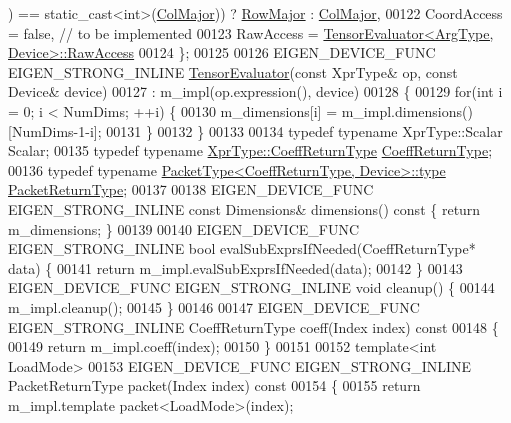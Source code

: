 \begin{DoxyCode}
      ) == static\_cast<int>(\hyperlink{group__enums_ggaacded1a18ae58b0f554751f6cdf9eb13a0cbd4bdd0abcfc0224c5fcb5e4f6669a}{ColMajor})) ? \hyperlink{group__enums_ggaacded1a18ae58b0f554751f6cdf9eb13acfcde9cd8677c5f7caf6bd603666aae3}{RowMajor} : \hyperlink{group__enums_ggaacded1a18ae58b0f554751f6cdf9eb13a0cbd4bdd0abcfc0224c5fcb5e4f6669a}{ColMajor},
00122     CoordAccess = \textcolor{keyword}{false},  \textcolor{comment}{// to be implemented}
00123     RawAccess = \hyperlink{struct_eigen_1_1_tensor_evaluator}{TensorEvaluator<ArgType, Device>::RawAccess}
00124   \};
00125 
00126   EIGEN\_DEVICE\_FUNC EIGEN\_STRONG\_INLINE \hyperlink{struct_eigen_1_1_tensor_evaluator}{TensorEvaluator}(\textcolor{keyword}{const} XprType& op, \textcolor{keyword}{const} Device& 
      device)
00127       : m\_impl(op.expression(), device)
00128   \{
00129     \textcolor{keywordflow}{for}(\textcolor{keywordtype}{int} i = 0; i < NumDims; ++i) \{
00130       m\_dimensions[i] = m\_impl.dimensions()[NumDims-1-i];
00131     \}
00132   \}
00133 
00134   \textcolor{keyword}{typedef} \textcolor{keyword}{typename} XprType::Scalar Scalar;
00135   \textcolor{keyword}{typedef} \textcolor{keyword}{typename} \hyperlink{group___sparse_core___module}{XprType::CoeffReturnType} 
      \hyperlink{group___sparse_core___module}{CoeffReturnType};
00136   \textcolor{keyword}{typedef} \textcolor{keyword}{typename} \hyperlink{group___sparse_core___module}{PacketType<CoeffReturnType, Device>::type} 
      \hyperlink{group___sparse_core___module}{PacketReturnType};
00137 
00138   EIGEN\_DEVICE\_FUNC EIGEN\_STRONG\_INLINE \textcolor{keyword}{const} Dimensions& dimensions()\textcolor{keyword}{ const }\{ \textcolor{keywordflow}{return} m\_dimensions; \}
00139 
00140   EIGEN\_DEVICE\_FUNC EIGEN\_STRONG\_INLINE \textcolor{keywordtype}{bool} evalSubExprsIfNeeded(CoeffReturnType* data) \{
00141     \textcolor{keywordflow}{return} m\_impl.evalSubExprsIfNeeded(data);
00142   \}
00143   EIGEN\_DEVICE\_FUNC EIGEN\_STRONG\_INLINE \textcolor{keywordtype}{void} cleanup() \{
00144     m\_impl.cleanup();
00145   \}
00146 
00147   EIGEN\_DEVICE\_FUNC EIGEN\_STRONG\_INLINE CoeffReturnType coeff(Index index)\textcolor{keyword}{ const}
00148 \textcolor{keyword}{  }\{
00149     \textcolor{keywordflow}{return} m\_impl.coeff(index);
00150   \}
00151 
00152   \textcolor{keyword}{template}<\textcolor{keywordtype}{int} LoadMode>
00153   EIGEN\_DEVICE\_FUNC EIGEN\_STRONG\_INLINE PacketReturnType packet(Index index)\textcolor{keyword}{ const}
00154 \textcolor{keyword}{  }\{
00155     \textcolor{keywordflow}{return} m\_impl.template packet<LoadMode>(index);

\end{DoxyCode}
